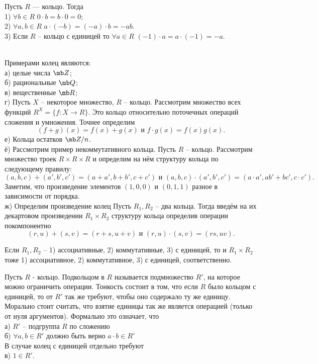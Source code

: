  Пусть $R$ — кольцо. Тогда \\
1) $\forall b \in R$  $0\cdot b = b\cdot 0 = 0$;\\
2) $\forall a,b \in R$  $a\cdot(-b) = (-a)\cdot b = -ab$.\\
3) Если $R$ -- кольцо с единицей то $\forall a \in R$  $(-1)\cdot a = a\cdot (-1) = -a$.
\elm





\exm \\
Примерами колец являются:\\
а) целые числа $\mb Z$;\\
б) рациональные $\mb Q$;\\
в) вещественные $\mb R$;\\
г) Пусть $X$ – некоторое множество, $R$ – кольцо. Рассмотрим множество всех функций $R^X=\{f\colon X \to R\}$. Это кольцо относительно поточечных операций сложения и умножения. Точнее определим 
$$(f+g)(x)=f(x)+g(x) \text{ и } f\cdot g(x)=f(x)g(x).$$
е) Кольца остатков $\mb Z/n$.\\
ё) Рассмотрим пример некоммутативного кольца. Пусть $R$ -- кольцо. Рассмотрим множество троек $R\times R\times R$ и определим на нём структуру кольца по следующему правилу:
$$(a,b,c) + (a',b',c')=(a+a',b+b',c+c') \text{ и } (a,b,c) \cdot (a',b',c')=(a\cdot a',ab'+bc',c\cdot c').$$
Заметим, что произведение элементов $(1,0,0)$ и $(0,1,1)$ разное в зависимости от порядка.\\
ж) Определим произведение колец
\dfn Пусть $R_1, R_2$ -- два кольца. Тогда введём на  их декартовом произведении $R_1\times R_2$ структуру кольца определив операции покомпонентно 
$$(r,u)+(s,v)=(r+s,u+v) \text{ и } (r,u)\cdot(s,v)=(rs, uv).$$
\edfn

\rm
Если $R_1,R_2$ -- 1) ассоциативные, 2) коммутативные, 3) с единицей, то и $R_1\times R_2$  тоже 1) ассоциативное, 2) коммутативное, 3) с единицей, соответственно.
\erm

\dfn[Подкольцо] Пусть $R$ - кольцо. Подкольцом в $R$ называется подмножество $R'$, на которое можно
ограничить операции. Тонкость состоит в том, что если $R$ было кольцом с единицей, то от $R'$ так же требуют, чтобы оно содержало ту же единицу. Морально стоит считать, что взятие единицы так же является операцией (только от нуля аргументов).
Формально это означает, что\\
а) $R'$ -- подгруппа $R$ по сложению\\
б) $\forall a,b\in R'$ должно быть верно $a\cdot b \in R'$ \\
В случае колец с единицей отдельно требуют\\
в) $1\in R'$.
\edfn



